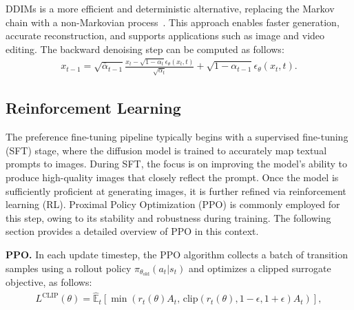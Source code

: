 DDIMs is a more efficient and deterministic alternative, replacing the Markov chain with a non-Markovian process~\citep{song2020denoising}. This approach enables faster generation, accurate reconstruction, and supports applications such as image and video editing. The backward denoising step can be computed as follows:
{\small
\begin{equation}
\label{eq:back_denoise}
\begin{aligned}
x_{t-1} =\sqrt{ \bar {\alpha}_{t-1}}\frac{x_{t}-\sqrt{1-\alpha_{t} }\epsilon _{\theta }(x_{t},t)  }{\sqrt{\alpha_{t}}} + \sqrt{1-\alpha_{t-1} }\epsilon _{\theta }(x_{t},t). \nonumber
\end{aligned}
\end{equation}
}

\subsection{Reinforcement Learning}

The preference fine-tuning pipeline typically begins with a supervised fine-tuning (SFT) stage, where the diffusion model is trained to accurately map textual prompts to images. During SFT, the focus is on improving the model’s ability to produce high-quality images that closely reflect the prompt. Once the model is sufficiently proficient at generating images, it is further refined via reinforcement learning (RL). Proximal Policy Optimization (PPO) \citep{schulman2017proximal} is commonly employed for this step, owing to its stability and robustness during training. The following section provides a detailed overview of PPO in this context.


\noindent \textbf{PPO.} In each update timestep, the PPO algorithm collects a batch of transition samples using a rollout policy $\pi_{\theta_{\text{old}}}(a_t | s_t)$ and optimizes a clipped surrogate objective, as follows:
{\small
\begin{align}
L^{\text{CLIP}}(\theta) = \hat{\mathbb{E}}_t \left[ \min \left( r_t(\theta) A_t, \, \text{clip}\left( r_t(\theta), 1 - \epsilon, 1 + \epsilon \right) A_t \right) \right], \nonumber
\end{align}
}

